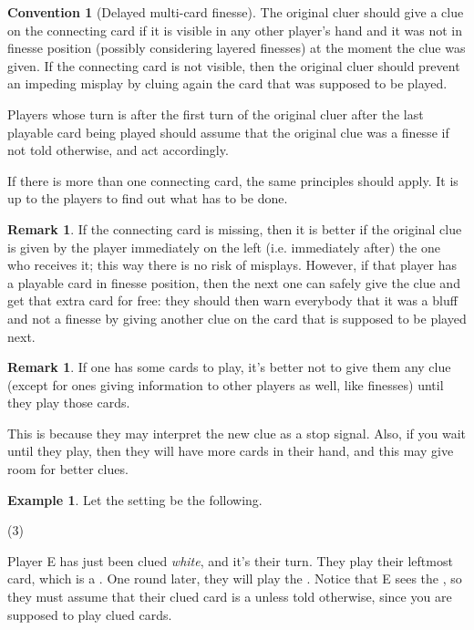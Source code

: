 \documentclass[a4paper]{article}
\theoremstyle{plain}
\theoremstyle{definition}
\newtheorem{remark}[theorem]{Remark}
\newtheorem{example}[theorem]{Example}
\newtheorem{convention}[theorem]{Convention}
\begin{document}
\begin{convention}[Delayed multi-card finesse]
	The original cluer should give a clue on the connecting card if it is visible in any other player's hand and it was not in finesse position (possibly considering layered finesses) at the moment the clue was given. If the connecting card is not visible, then the original cluer should prevent an impeding misplay by cluing again the card that was supposed to be played.
	
	Players whose turn is after the first turn of the original cluer after the last playable card being played should assume that the original clue was a finesse if not told otherwise, and act accordingly.
	
	If there is more than one connecting card, the same principles should apply. It is up to the players to find out what has to be done.
\end{convention}

\begin{remark}
	If the connecting card is missing, then it is better if the original clue is given by the player immediately on the left (i.e. immediately after) the one who receives it; this way there is no risk of misplays. However, if that player has a playable card in finesse position, then the next one can safely give the clue and get that extra card for free: they should then warn everybody that it was a bluff and not a finesse by giving another clue on the card that is supposed to be played next.
\end{remark}

\begin{remark}
	If one has some cards to play, it's better not to give them any clue (except for ones giving information to other players as well, like finesses) until they play those cards.
\end{remark}

This is because they may interpret the new clue as a stop signal. Also, if you wait until they play, then they will have more cards in their hand, and this may give room for better clues.

\begin{example}
	
	Let the setting be the following.
	
	\begin{tasks}(3)
		\task[+]      
		\task[A]    
		\task[B]    
		\task[C]    
		\task[D]    
		\task[E]    
	\end{tasks}

	Player E has just been clued \textit{white}, and it's their turn. They play their leftmost card, which is a . One round later, they will play the . Notice that E sees the , so they must assume that their clued card is a  unless told otherwise, since you are supposed to play clued cards.

\end{example}
\end{document}
